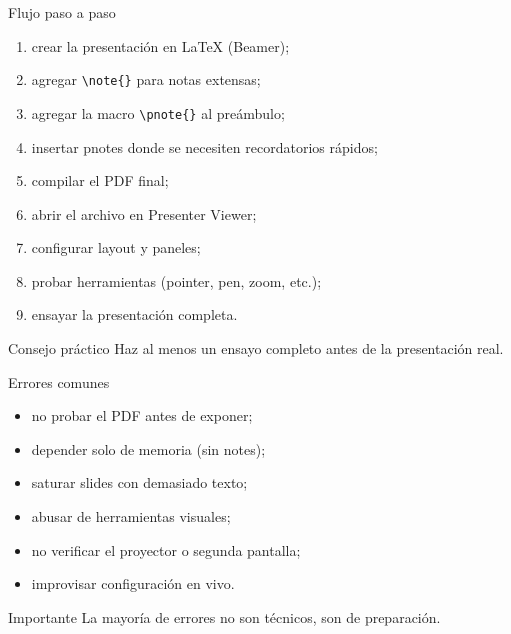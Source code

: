 \documentclass[aspectratio=169,professionalfonts]{beamer}
\begin{document}
\begin{frame}{Flujo paso a paso}
\begin{enumerate}
    \item crear la presentación en LaTeX (Beamer);
    \item agregar \texttt{\textbackslash note\{\}} para notas extensas;
    \item agregar la macro \texttt{\textbackslash pnote\{\}} al preámbulo;
    \item insertar pnotes donde se necesiten recordatorios rápidos;
    \item compilar el PDF final;
    \item abrir el archivo en Presenter Viewer;
    \item configurar layout y paneles;
    \item probar herramientas (pointer, pen, zoom, etc.);
    \item ensayar la presentación completa.
\end{enumerate}

\begin{alertblock}{Consejo práctico}
Haz al menos un ensayo completo antes de la presentación real.
\end{alertblock}

\end{frame}

\begin{frame}{Errores comunes}
\begin{itemize}
  \item no probar el PDF antes de exponer;
  \item depender solo de memoria (sin notes);
  \item saturar slides con demasiado texto;
  \item abusar de herramientas visuales;
  \item no verificar el proyector o segunda pantalla;
  \item improvisar configuración en vivo.
\end{itemize}

\begin{alertblock}{Importante}
La mayoría de errores no son técnicos, son de preparación.
\end{alertblock}

\end{frame}
\end{document}
